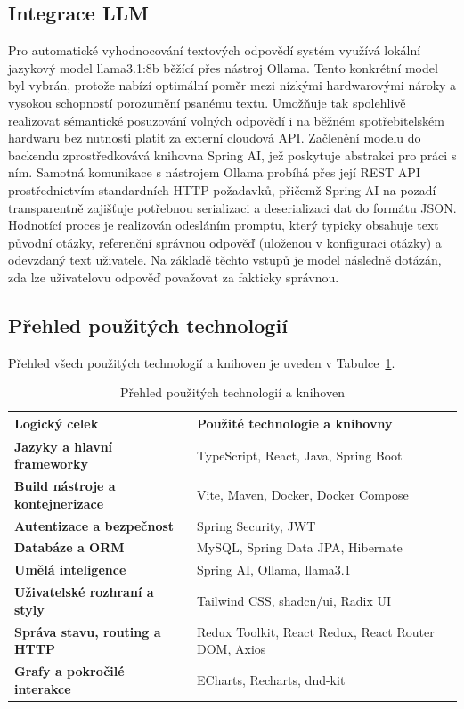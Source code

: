 \documentclass{vskpou} %
\begin{document}
\subsection{Integrace LLM}

Pro automatické vyhodnocování textových odpovědí systém využívá lokální jazykový model llama3.1:8b běžící přes nástroj Ollama. Tento konkrétní model byl vybrán, protože nabízí optimální poměr mezi nízkými hardwarovými nároky a vysokou schopností porozumění psanému textu. Umožňuje tak spolehlivě realizovat sémantické posuzování volných odpovědí i na běžném spotřebitelském hardwaru bez nutnosti platit za externí cloudová API.
Začlenění modelu do backendu zprostředkovává knihovna Spring AI, jež poskytuje abstrakci pro práci s ním. Samotná komunikace s nástrojem Ollama probíhá přes její REST API prostřednictvím standardních HTTP požadavků, přičemž Spring AI na pozadí transparentně zajišťuje potřebnou serializaci a deserializaci dat do formátu JSON. Hodnotící proces je realizován odesláním promptu, který typicky obsahuje text původní otázky, referenční správnou odpověď (uloženou v konfiguraci otázky) a odevzdaný text uživatele. Na základě těchto vstupů je model následně dotázán, zda lze uživatelovu odpověď považovat za fakticky správnou.

\subsection{Přehled použitých technologií}

Přehled všech použitých technologií a knihoven je uveden v Tabulce~\ref{tab:technologie}.

\begin{table}[htbp]
\caption{Přehled použitých technologií a knihoven}
\label{tab:technologie}
\centering
\begin{tabular}{|p{}|p{}|}
\hline
\textbf{Logický celek} & \textbf{Použité technologie a knihovny} \\ \hline
\textbf{Jazyky a hlavní frameworky} & TypeScript, React, Java, Spring Boot \\ \hline
\textbf{Build nástroje a kontejnerizace} & Vite, Maven, Docker, Docker Compose \\ \hline
\textbf{Autentizace a bezpečnost} & Spring Security, JWT \\ \hline
\textbf{Databáze a ORM} & MySQL, Spring Data JPA, Hibernate \\ \hline
\textbf{Umělá inteligence} & Spring AI, Ollama, llama3.1 \\ \hline
\textbf{Uživatelské rozhraní a styly} & Tailwind CSS, shadcn/ui, Radix UI \\ \hline
\textbf{Správa stavu, routing a HTTP} & Redux Toolkit, React Redux, React Router DOM, Axios \\ \hline
\textbf{Grafy a pokročilé interakce} & ECharts, Recharts, dnd-kit \\ \hline
\end{tabular}
\end{table}
\end{document}
